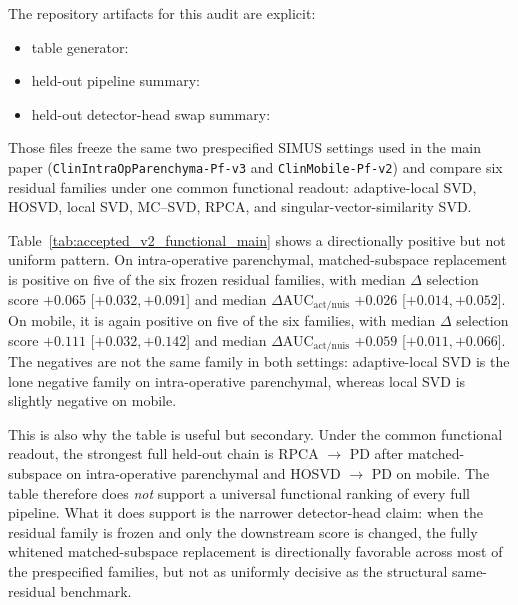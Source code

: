 The repository artifacts for this audit are explicit:
\begin{itemize}[nosep,leftmargin=1.8em]
  \item table generator: 
  \item held-out pipeline summary: 
  \item held-out detector-head swap summary: 
\end{itemize}
\noindent Those files freeze the same two prespecified SIMUS settings used in the main paper (\texttt{ClinIntraOpParenchyma-Pf-v3} and \texttt{ClinMobile-Pf-v2}) and compare six residual families under one common functional readout: adaptive-local SVD, HOSVD, local SVD, MC--SVD, RPCA, and singular-vector-similarity SVD.


Table~\ref{tab:accepted_v2_functional_main} shows a directionally positive but not uniform pattern. On intra-operative parenchymal, matched-subspace replacement is positive on five of the six frozen residual families, with median $\Delta$ selection score $+0.065$ [$+0.032,+0.091$] and median $\Delta$AUC$_{\mathrm{act/nuis}}$ $+0.026$ [$+0.014,+0.052$]. On mobile, it is again positive on five of the six families, with median $\Delta$ selection score $+0.111$ [$+0.032,+0.142$] and median $\Delta$AUC$_{\mathrm{act/nuis}}$ $+0.059$ [$+0.011,+0.066$]. The negatives are not the same family in both settings: adaptive-local SVD is the lone negative family on intra-operative parenchymal, whereas local SVD is slightly negative on mobile.

This is also why the table is useful but secondary. Under the common functional readout, the strongest full held-out chain is RPCA $\rightarrow$ PD after matched-subspace on intra-operative parenchymal and HOSVD $\rightarrow$ PD on mobile. The table therefore does \emph{not} support a universal functional ranking of every full pipeline. What it does support is the narrower detector-head claim: when the residual family is frozen and only the downstream score is changed, the fully whitened matched-subspace replacement is directionally favorable across most of the prespecified families, but not as uniformly decisive as the structural same-residual benchmark.

